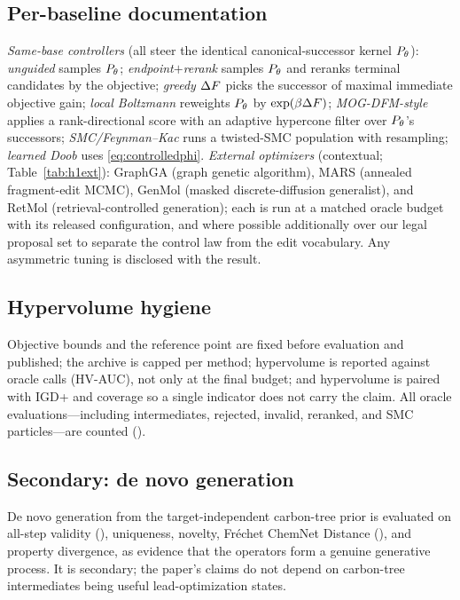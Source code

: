 \subsection{Per-baseline documentation}
\emph{Same-base controllers} (all steer the identical canonical-successor kernel $P_\theta$): \emph{unguided}
samples $P_\theta$; \emph{endpoint$+$rerank} samples $P_\theta$ and reranks terminal candidates by the
objective; \emph{greedy $\Delta F$} picks the successor of maximal immediate objective gain;
\emph{local Boltzmann} reweights $P_\theta$ by $\exp(\beta\Delta F)$; \emph{MOG-DFM-style} applies a
rank-directional score with an adaptive hypercone filter over $P_\theta$'s successors; \emph{SMC/Feynman--Kac}
runs a twisted-SMC population with resampling; \emph{learned Doob} uses \eqref{eq:controlledphi}. \emph{External
optimizers} (contextual; Table~\ref{tab:h1ext}): GraphGA (graph genetic algorithm), MARS (annealed
fragment-edit MCMC), GenMol (masked discrete-diffusion generalist), and RetMol (retrieval-controlled
generation); each is run at a matched oracle budget with its released configuration, and where possible
additionally over our legal proposal set to separate the control law from the edit vocabulary. Any
asymmetric tuning is disclosed with the result.

\subsection{Hypervolume hygiene}
Objective bounds and the reference point are fixed before evaluation and published; the archive is capped
per method; hypervolume is reported against oracle calls (HV-AUC), not only at the final budget; and
hypervolume is paired with IGD+ and coverage so a single indicator does not carry the claim. All oracle
evaluations---including intermediates, rejected, invalid, reranked, and SMC particles---are counted
().

\subsection{Secondary: de novo generation}
De novo generation from the target-independent carbon-tree prior is evaluated on all-step validity
(), uniqueness, novelty, Fr\'echet ChemNet Distance (), and
property divergence, as evidence that the operators form a genuine generative process. It is secondary; the
paper's claims do not depend on carbon-tree intermediates being useful lead-optimization states.



